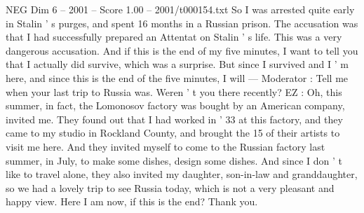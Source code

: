 \begin{textsample}{NEG Dim 6 – 2001 – Score 1.00 – 2001/t000154.txt}
So I was arrested quite early in Stalin ' s purges, and spent 16 months in a Russian prison.
The accusation was that I had successfully prepared an Attentat on Stalin ' s life.
This was a very dangerous accusation.
And if this is the end of my five minutes, I want to tell you that I actually did survive, which was a surprise.
But since I survived and I ' m here, and since this is the end of the five minutes, I will — Moderator : Tell me when your last trip to Russia was.
Weren ' t you there recently?
EZ : Oh, this summer, in fact, the Lomonosov factory was bought by an American company, invited me.
They found out that I had worked in ' 33 at this factory, and they came to my studio in Rockland County, and brought the 15 of their artists to visit me here.
And they invited myself to come to the Russian factory last summer, in July, to make some dishes, design some dishes.
And since I don ' t like to travel alone, they also invited my daughter, son-in-law and granddaughter, so we had a lovely trip to see Russia today, which is not a very pleasant and happy view.
Here I am now, if this is the end?
Thank you.

\end{textsample}
